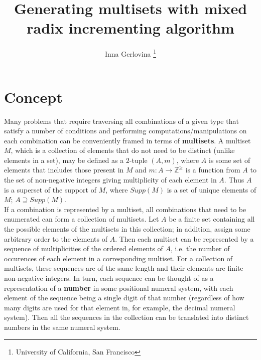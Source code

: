 \documentclass[12pt]{article}
\begin{document}


\title{Generating multisets with mixed radix incrementing algorithm}
\author{Inna Gerlovina \thanks{University of California, San Francisco}}
\date{}  
\maketitle

\section{Concept}

Many problems that require traversing all combinations of a given type that satisfy a number of conditions and performing computations/manipulations on each combination can be conveniently framed in terms of \textbf{multisets}. A multiset $M$, which is a collection of elements that do not need to be distinct (unlike elements in a set), may be defined as a $2$-tuple $(A, m)$, where $A$ is some set of elements that includes those present in $M$ and $m:A \to \mathbb{Z}^{\geqslant}$ is a function from $A$ to the set of non-negative integers giving multiplicity of each element in $A$. Thus $A$ is a superset of the support of $M$, where $Supp(M)$ is a set of unique elements of $M$; $A \supseteq Supp(M)$. \\

If a combination is represented by a multiset, all combinations that need to be enumerated can form a collection of multisets. Let $A$ be a finite set containing all the possible elements of the multisets in this collection; in addition, assign some arbitrary order to the elements of $A$. Then each multiset can be represented by a sequence of multiplicities of the ordered elements of $A$, i.e. the number of occurences of each element in a corresponding multiset. For a collection of multisets, these sequences are of the same length and their elements are finite non-negative integers. In turn, each sequence can be thought of as a representation of a \textbf{number} in some positional numeral system, with each element of the sequence being a single digit of that number (regardless of how many digits are used for that element in, for example, the decimal numeral system). Then all the sequences in the collection can be translated into distinct numbers in the same numeral system. \\
\end{document}
